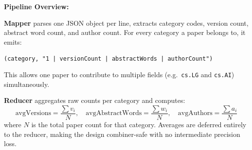 \documentclass[11pt,a4paper]{article}
\begin{document}
\textbf{Pipeline Overview:}
\vspace{3pt}
\begin{center}
\end{center}
\vspace{1pt}

\textbf{Mapper} parses one JSON object per line, extracts category codes, version count, abstract word count, and author count. For every category a paper belongs to, it emits:
\begin{center}
  \texttt{(category,\ "1\,|\,versionCount\,|\,abstractWords\,|\,authorCount")}
\end{center}
This allows one paper to contribute to multiple fields (e.g.\ \texttt{cs.LG} and \texttt{cs.AI}) simultaneously.

\textbf{Reducer} aggregates raw counts per category and computes:
\[
  \text{avgVersions}=\frac{\sum v_i}{N},\quad
  \text{avgAbstractWords}=\frac{\sum w_i}{N},\quad
  \text{avgAuthors}=\frac{\sum a_i}{N}
\]
where $N$ is the total paper count for that category. Averages are deferred entirely to the reducer, making the design combiner-safe with no intermediate precision loss.
\end{document}
